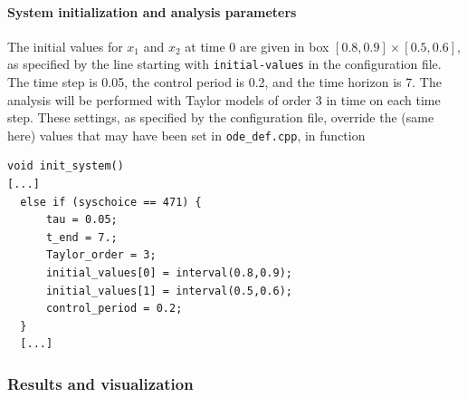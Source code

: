 \documentclass{article}
\begin{document}
\paragraph{System initialization and analysis parameters}
The initial values for $x_1$ and $x_2$ at time 0 are given in box $[0.8,0.9] \times [0.5,0.6]$, as specified by the line starting with \texttt{initial-values} in the configuration file.  
The time step is 0.05, the control period is 0.2, and the time horizon is 7.  The analysis will be performed with Taylor models of order 3 in time on each time step. 
These settings, as specified by the configuration file,  override the (same here) values that may have been set in \texttt{ode\_def.cpp}, in function 

\small
\lstset {language=C++}
\begin{lstlisting}
void init_system()
[...]
  else if (syschoice == 471) {  
      tau = 0.05; 
      t_end = 7.;  
      Taylor_order = 3;
      initial_values[0] = interval(0.8,0.9);
      initial_values[1] = interval(0.5,0.6);
      control_period = 0.2;
  }
  [...]
\end{lstlisting}
\normalsize     

\subsubsection{Results and visualization}
\end{document}

